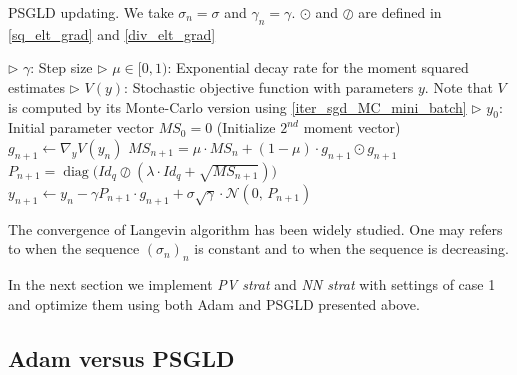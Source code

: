 \documentclass{article}
\DeclareMathOperator{\diag}{diag}
\numberwithin{equation}{section}
\begin{document}
\begin{algorithm}[ht]
  \caption{PSGLD updating. We take $\sigma_n = \sigma$ and $\gamma_n = \gamma$. $\odot$ and $\oslash$ are defined in \eqref{sq_elt_grad} and \eqref{div_elt_grad}}\label{alg:algorithm2}
  \begin{algorithmic}[1]
    \Require
      \Statex $\rhd$ $\gamma$: Step size
      \Statex $\rhd$ $\mu \in [0, 1)$: Exponential decay rate for the moment squared estimates
      \Statex $\rhd$ $V(y)$: Stochastic objective function with parameters $y$. Note that $V$ is computed by its Monte-Carlo version using \eqref{iter_sgd_MC_mini_batch}
      \Statex $\rhd$ $y_0$: Initial parameter vector
	\Statex
      \hspace{0.4cm} \Statex $MS_0 = 0$ (Initialize $2^{nd}$ moment vector)
    \Statex
      \State $g_{n+1} \gets \nabla_y V(y_n)$ 
      \State $MS_{n+1} = \mu \cdot MS_n + (1 - \mu) \cdot g_{n+1} \odot g_{n+1}$ 
      \State $P_{n+1} = \diag\Big(Id_q \oslash (\lambda \cdot Id_q + \sqrt{MS_{n+1}}) \Big)$ 
      \State $y_{n+1} \gets y_n - \gamma P_{n+1} \cdot g_{n+1} + \sigma \sqrt{\gamma}\cdot \mathcal{N}(0,\,P_{n+1})$ 
    \EndWhile
    
  \end{algorithmic}
\end{algorithm}

The convergence of Langevin algorithm has been widely studied. One may refers to \cite{langcvg, durmus2018highdimensional} when the sequence $(\sigma_n)_n$ is constant and to \cite{bras:hal-03891234,Pags2020UnadjustedLA} when the sequence is decreasing.


In the next section we implement \textit{PV strat} and \textit{NN strat} with settings of case 1 and optimize them using both Adam and PSGLD presented above.

\subsection{Adam versus PSGLD}
\label{compar_algo}

\indent
\end{document}
